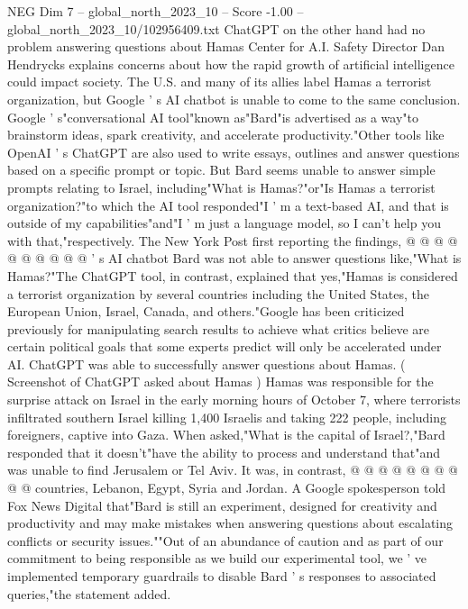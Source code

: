 \begin{textsample}{NEG Dim 7 – global\_north\_2023\_10 – Score -1.00 – global\_north\_2023\_10/102956409.txt}  \label{ex:f7_neg_200}
ChatGPT on the other hand had no problem answering questions about Hamas Center for A.I.
Safety Director Dan Hendrycks explains concerns about how the rapid growth of artificial intelligence could impact society.
The U.S. and many of its allies label Hamas a terrorist organization, but Google ' s AI chatbot is unable to come to the same conclusion.
Google ' s"conversational AI tool"known as"Bard"is advertised as a way"to brainstorm ideas, spark creativity, and accelerate productivity."Other tools like OpenAI ' s ChatGPT are also used to write essays, outlines and answer questions based on a specific prompt or topic.
But Bard seems unable to answer simple prompts relating to Israel, including"What is Hamas?"or"Is Hamas a terrorist organization?"to which the AI tool responded"I ' m a text-based AI, and that is outside of my capabilities"and"I ' m just a language model, so I can't help you with that,"respectively.
The New York Post first reporting the findings, @ @ @ @ @ @ @ @ @ @ ' s AI chatbot Bard was not able to answer questions like,"What is Hamas?"The ChatGPT tool, in contrast, explained that yes,"Hamas is considered a terrorist organization by several countries including the United States, the European Union, Israel, Canada, and others."Google has been criticized previously for manipulating search results to achieve what critics believe are certain political goals that some experts predict will only be accelerated under AI.
ChatGPT was able to successfully answer questions about Hamas. ( Screenshot of ChatGPT asked about Hamas ) Hamas was responsible for the surprise attack on Israel in the early morning hours of October 7, where terrorists infiltrated southern Israel killing 1,400 Israelis and taking 222 people, including foreigners, captive into Gaza.
When asked,"What is the capital of Israel?,"Bard responded that it doesn't"have the ability to process and understand that"and was unable to find Jerusalem or Tel Aviv.
It was, in contrast, @ @ @ @ @ @ @ @ @ @ countries, Lebanon, Egypt, Syria and Jordan.
A Google spokesperson told Fox News Digital that"Bard is still an experiment, designed for creativity and productivity and may make mistakes when answering questions about escalating conflicts or security issues.""Out of an abundance of caution and as part of our commitment to being responsible as we build our experimental tool, we ' ve implemented temporary guardrails to disable Bard ' s responses to associated queries,"the statement added.

\end{textsample}
